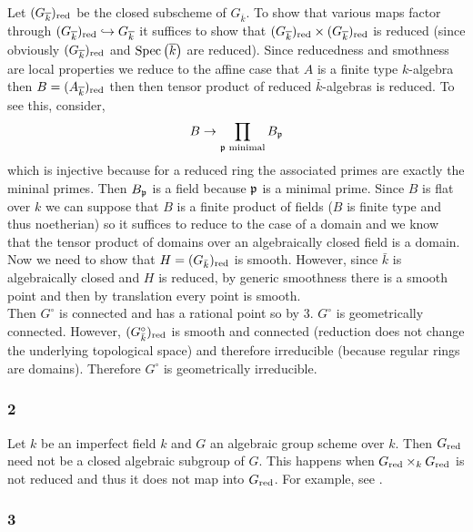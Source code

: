 \documentclass[12pt]{article}
\begin{document}
Let $(G_{\overline{k}})_{\mathrm{red}}$ be the closed subscheme of $G_{\overline{k}}$. To show that various maps factor through $(G_{\overline{k}})_{\mathrm{red}} \hookrightarrow G_{\overline{k}}$ it suffices to show that $(G_{\overline{k}})_{\mathrm{red}} \times (G_{\overline{k}})_{\mathrm{red}}$ is reduced (since obviously $(G_{\overline{k}})_{\mathrm{red}}$ and $\mathrm{Spec}\left( \overline{k} \right)$ are reduced). Since reducedness and smothness are local properties we reduce to the affine case that $A$ is a finite type $k$-algebra then $B = (A_{\overline{k}})_{\mathrm{red}}$ then then tensor product of reduced $\bar{k}$-algebras is reduced. To see this, consider,
\[ B \to \prod_{\mathfrak{p} \text{ minimal}} B_{\mathfrak{p}} \]
which is injective because for a reduced ring the associated primes are exactly the mininal primes. Then $B_{\mathfrak{p}}$ is a field because $\mathfrak{p}$ is a minimal prime. Since $B$ is flat over $k$ we can suppose that $B$ is a finite product of fields ($B$ is finite type and thus noetherian) so it suffices to reduce to the case of a domain and we know that the tensor product of domains over an algebraically closed field is a domain. 
\bigskip\\
Now we need to show that $H = (G_{\bar{k}})_{\mathrm{red}}$ is smooth. However, since $\bar{k}$ is algebraically closed and $H$ is reduced, by generic smoothness there is a smooth point and then by translation every point is smooth. 
\bigskip\\
Then $G^\circ$ is connected and has a rational point so by 3. $G^\circ$ is geometrically connected. However, $(G^\circ_{\bar{k}})_{\mathrm{red}}$ is smooth and connected (reduction does not change the underlying topological space) and therefore irreducible (because regular rings are domains). Therefore $G^\circ$ is geometrically irreducible.

\subsubsection{2}

Let $k$ be an imperfect field $k$ and $G$ an algebraic group scheme over $k$. Then $G_{\mathrm{red}}$ need not be a closed algebraic subgroup of $G$. This happens when $G_{\mathrm{red}} \times_k G_{\mathrm{red}}$ is not reduced and thus it does not map into $G_{\mathrm{red}}$. For example, see .

\subsubsection{3}
\end{document}
